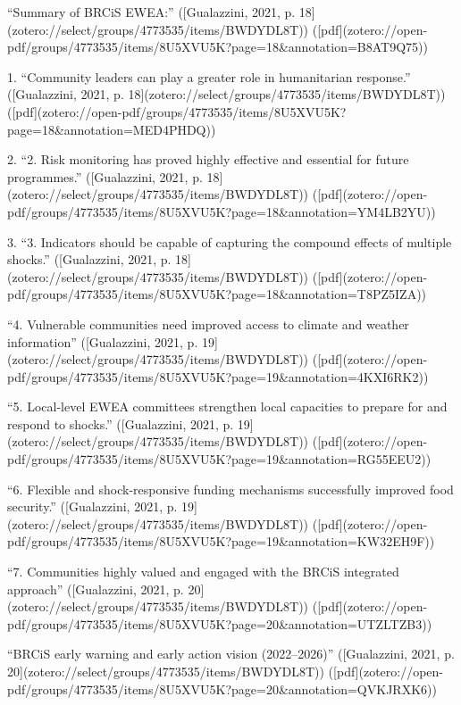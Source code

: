{%
“Summary of BRCiS EWEA:” ([Gualazzini, 2021, p. 18](zotero://select/groups/4773535/items/BWDYDL8T)) ([pdf](zotero://open-pdf/groups/4773535/items/8U5XVU5K?page=18&annotation=B8AT9Q75))

1. “Community leaders can play a greater role in humanitarian response.” ([Gualazzini, 2021, p. 18](zotero://select/groups/4773535/items/BWDYDL8T)) ([pdf](zotero://open-pdf/groups/4773535/items/8U5XVU5K?page=18&annotation=MED4PHDQ))

2. “2. Risk monitoring has proved highly effective and essential for future programmes.” ([Gualazzini, 2021, p. 18](zotero://select/groups/4773535/items/BWDYDL8T)) ([pdf](zotero://open-pdf/groups/4773535/items/8U5XVU5K?page=18&annotation=YM4LB2YU))


3. “3. Indicators should be capable of capturing the compound effects of multiple shocks.” ([Gualazzini, 2021, p. 18](zotero://select/groups/4773535/items/BWDYDL8T)) ([pdf](zotero://open-pdf/groups/4773535/items/8U5XVU5K?page=18&annotation=T8PZ5IZA))

“4. Vulnerable communities need improved access to climate and weather information” ([Gualazzini, 2021, p. 19](zotero://select/groups/4773535/items/BWDYDL8T)) ([pdf](zotero://open-pdf/groups/4773535/items/8U5XVU5K?page=19&annotation=4KXI6RK2))

“5. Local-level EWEA committees strengthen local capacities to prepare for and respond to shocks.” ([Gualazzini, 2021, p. 19](zotero://select/groups/4773535/items/BWDYDL8T)) ([pdf](zotero://open-pdf/groups/4773535/items/8U5XVU5K?page=19&annotation=RG55EEU2))

“6. Flexible and shock-responsive funding mechanisms successfully improved food security.” ([Gualazzini, 2021, p. 19](zotero://select/groups/4773535/items/BWDYDL8T)) ([pdf](zotero://open-pdf/groups/4773535/items/8U5XVU5K?page=19&annotation=KW32EH9F))

“7. Communities highly valued and engaged with the BRCiS integrated approach” ([Gualazzini, 2021, p. 20](zotero://select/groups/4773535/items/BWDYDL8T)) ([pdf](zotero://open-pdf/groups/4773535/items/8U5XVU5K?page=20&annotation=UTZLTZB3))

“BRCiS early warning and early action vision (2022–2026)” ([Gualazzini, 2021, p. 20](zotero://select/groups/4773535/items/BWDYDL8T)) ([pdf](zotero://open-pdf/groups/4773535/items/8U5XVU5K?page=20&annotation=QVKJRXK6))



}
